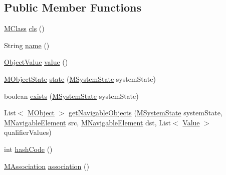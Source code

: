 \subsection*{Public Member Functions}
\begin{DoxyCompactItemize}
\item 
\hyperlink{interfaceorg_1_1tzi_1_1use_1_1uml_1_1mm_1_1_m_class}{M\-Class} \hyperlink{classorg_1_1tzi_1_1use_1_1uml_1_1sys_1_1_m_link_object_impl_a1552276497b6532ec01946cba3542dba}{cls} ()
\item 
String \hyperlink{classorg_1_1tzi_1_1use_1_1uml_1_1sys_1_1_m_link_object_impl_ac557c0402d66c4f5b06d35a0b071bfc1}{name} ()
\item 
\hyperlink{classorg_1_1tzi_1_1use_1_1uml_1_1ocl_1_1value_1_1_object_value}{Object\-Value} \hyperlink{classorg_1_1tzi_1_1use_1_1uml_1_1sys_1_1_m_link_object_impl_a5dbb37fe7d643dc86b1a16c6ca24da2c}{value} ()
\item 
\hyperlink{classorg_1_1tzi_1_1use_1_1uml_1_1sys_1_1_m_object_state}{M\-Object\-State} \hyperlink{classorg_1_1tzi_1_1use_1_1uml_1_1sys_1_1_m_link_object_impl_a6ee8a3355d1a828827389c7ac5f2aeff}{state} (\hyperlink{classorg_1_1tzi_1_1use_1_1uml_1_1sys_1_1_m_system_state}{M\-System\-State} system\-State)
\item 
boolean \hyperlink{classorg_1_1tzi_1_1use_1_1uml_1_1sys_1_1_m_link_object_impl_a9e3f4d519133039c4ece06af81c13c28}{exists} (\hyperlink{classorg_1_1tzi_1_1use_1_1uml_1_1sys_1_1_m_system_state}{M\-System\-State} system\-State)
\item 
List$<$ \hyperlink{interfaceorg_1_1tzi_1_1use_1_1uml_1_1sys_1_1_m_object}{M\-Object} $>$ \hyperlink{classorg_1_1tzi_1_1use_1_1uml_1_1sys_1_1_m_link_object_impl_a6fdfd3645f5ec973e8d84264e9bd51f0}{get\-Navigable\-Objects} (\hyperlink{classorg_1_1tzi_1_1use_1_1uml_1_1sys_1_1_m_system_state}{M\-System\-State} system\-State, \hyperlink{interfaceorg_1_1tzi_1_1use_1_1uml_1_1mm_1_1_m_navigable_element}{M\-Navigable\-Element} src, \hyperlink{interfaceorg_1_1tzi_1_1use_1_1uml_1_1mm_1_1_m_navigable_element}{M\-Navigable\-Element} dst, List$<$ \hyperlink{classorg_1_1tzi_1_1use_1_1uml_1_1ocl_1_1value_1_1_value}{Value} $>$ qualifier\-Values)
\item 
int \hyperlink{classorg_1_1tzi_1_1use_1_1uml_1_1sys_1_1_m_link_object_impl_aaac1337c09ad501781b7c4f869a2510e}{hash\-Code} ()
\item 
\hyperlink{interfaceorg_1_1tzi_1_1use_1_1uml_1_1mm_1_1_m_association}{M\-Association} \hyperlink{classorg_1_1tzi_1_1use_1_1uml_1_1sys_1_1_m_link_object_impl_a89d7272cdd62992370f50c30e1b4b6e8}{association} ()

\end{DoxyCompactItemize}
